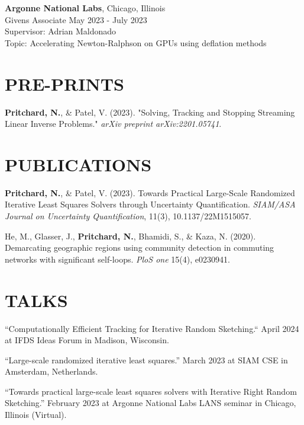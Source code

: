 \documentclass[margin,11pt]{res}
\def\nwp{\textbf{Pritchard, N.}}
\begin{document}
\begin{resume}
                {\bf Argonne National Labs}, \hfill Chicago, Illinois\\
                Givens Associate \hfill May 2023 - July 2023\\
                Supervisor: Adrian Maldonado\\
                Topic: Accelerating Newton-Ralphson on GPUs using deflation methods
\section{PRE-PRINTS}
\nwp, \& Patel, V. (2023). "Solving, Tracking and Stopping Streaming Linear Inverse Problems." \textit{arXiv preprint arXiv:2201.05741}.

\section{PUBLICATIONS}
\nwp, \& Patel, V. (2023). Towards Practical Large-Scale Randomized Iterative Least Squares Solvers through Uncertainty Quantification. \textit{SIAM/ASA Journal on Uncertainty Quantification}, 11(3), 10.1137/22M1515057. 

He, M., Glasser, J., \nwp, Bhamidi, S., \& Kaza, N. (2020). Demarcating geographic regions using community detection in commuting networks with significant self-loops. \textit{PloS one} 15(4), e0230941.



\section{TALKS}

``Computationally Efficient Tracking for Iterative Random Sketching.`` April 2024 at IFDS Ideas Forum in Madison, Wisconsin.

``Large-scale randomized iterative least squares.'' March 2023 at SIAM CSE in Amsterdam, Netherlands.

``Towards practical large-scale least squares solvers with Iterative Right Random Sketching.'' February 2023 at Argonne National Labs LANS seminar in Chicago, Illinois (Virtual).


\end{resume}
\end{document}
